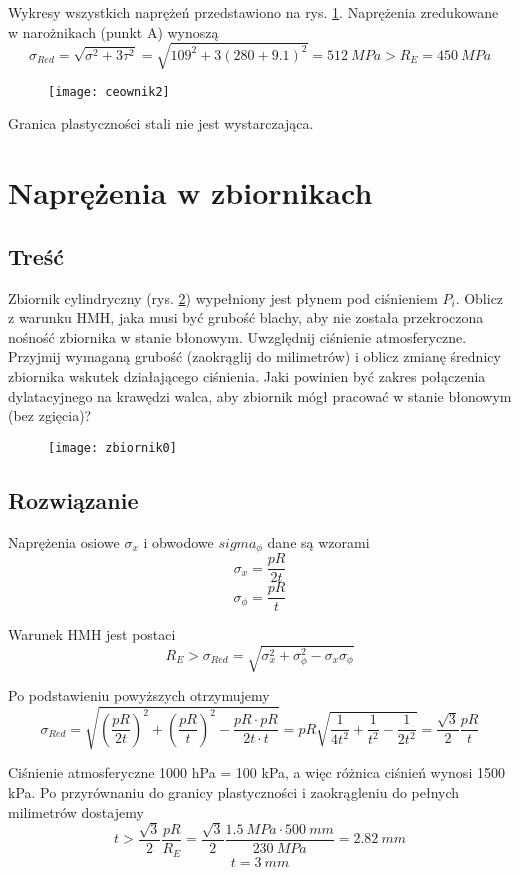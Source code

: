 \documentclass[a4paper,11pt]{article}
\begin{document}
Wykresy wszystkich naprężeń przedstawiono na rys. \ref{ceownik2}. Naprężenia zredukowane w narożnikach (punkt A) wynoszą
\[ \sigma_{Red} = \sqrt{\sigma^2 + 3 \tau^2} = \sqrt{109^2 + 3(280+9.1)^2} = \SI{512}{MPa} > R_E = \SI{450}{MPa} \]

\begin{figure}[tbh]\centering
	\texttt{[image: ceownik2]}
	\caption{}
	\label{ceownik2}
\end{figure}

Granica plastyczności stali nie jest wystarczająca.

\FloatBarrier
\clearpage

\section{Naprężenia w zbiornikach}
\subsection{Treść}
Zbiornik cylindryczny (rys. \ref{zbiornik0}) wypełniony jest płynem pod ciśnieniem $P_i$. Oblicz z warunku HMH, jaka musi być grubość blachy, aby nie została przekroczona nośność zbiornika w stanie błonowym. Uwzględnij ciśnienie atmosferyczne. Przyjmij wymaganą grubość (zaokrąglij do milimetrów) i oblicz zmianę średnicy zbiornika wskutek działającego ciśnienia. Jaki powinien być zakres połączenia dylatacyjnego na krawędzi walca, aby zbiornik mógł pracować w stanie błonowym (bez zgięcia)?

\begin{figure}[tbh]\centering
	\texttt{[image: zbiornik0]}
	\caption{}
	\label{zbiornik0}
\end{figure}

\subsection{Rozwiązanie}
Naprężenia osiowe $\sigma_x$ i obwodowe $sigma_{\phi}$ dane są wzorami
\[ \sigma_x = \frac{pR}{2t} \]
\[ \sigma_{\phi} = \frac{pR}{t} \]

Warunek HMH jest postaci
\[ R_E > \sigma_{Red} = \sqrt{\sigma_x^2 + \sigma_{\phi}^2 -\sigma_x \sigma_{\phi}} \]

Po podstawieniu powyższych otrzymujemy
\[ \sigma_{Red} = \sqrt{\left(\frac{pR}{2t}\right)^2 + \left(\frac{pR}{t}\right)^2-\frac{pR\cdot pR}{2t\cdot t}} = pR\sqrt{\frac{1}{4t^2}+\frac{1}{t^2}-\frac{1}{2t^2}} = \frac{\sqrt{3}}{2}\frac{pR}{t} \]

Ciśnienie atmosferyczne 1000 hPa = 100 kPa, a więc różnica ciśnień wynosi 1500 kPa. Po przyrównaniu do granicy plastyczności i zaokrągleniu do pełnych milimetrów dostajemy
\[ t > \frac{\sqrt{3}}{2} \frac{pR}{R_E} = \frac{\sqrt{3}}{2} \frac{\SI{1.5}{MPa}\cdot \SI{500}{mm}}{\SI{230}{MPa}} = \SI{2.82}{mm} \]
\[ t = \SI{3}{mm} \]
\end{document}
